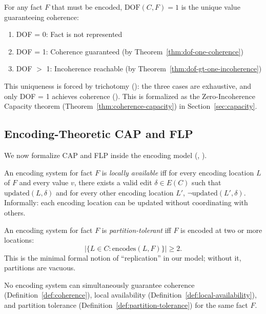 \begin{theorem}[DOF = 1 is Uniquely Coherent]\label{thm:dof-optimal}
For any fact $F$ that must be encoded, $\text{DOF}(C, F) = 1$ is the unique value guaranteeing coherence:
\begin{enumerate}
\tightlist
\item DOF = 0: Fact is not represented
\item DOF = 1: Coherence guaranteed (by Theorem~\ref{thm:dof-one-coherence})
\item DOF $>$ 1: Incoherence reachable (by Theorem~\ref{thm:dof-gt-one-incoherence})
\end{enumerate}
This uniqueness is forced by trichotomy (): the three cases are exhaustive, and only DOF = 1 achieves coherence (). This is formalized as the Zero-Incoherence Capacity theorem (Theorem~\ref{thm:coherence-capacity}) in Section~\ref{sec:capacity}.
\end{theorem}

\subsection{Encoding-Theoretic CAP and FLP}\label{sec:cap-flp}

We now formalize CAP and FLP inside the encoding model (, ).

\begin{definition}\label{def:local-availability}
An encoding system for fact $F$ is \emph{locally available} iff for every encoding location $L$ of $F$ and every value $v$, there exists a valid edit $\delta \in E(C)$ such that $\text{updated}(L, \delta)$ and for every other encoding location $L'$, $\neg \text{updated}(L', \delta)$. Informally: each encoding location can be updated without coordinating with others.
\end{definition}

\begin{definition}\label{def:partition-tolerance}
An encoding system for fact $F$ is \emph{partition-tolerant} iff $F$ is encoded at two or more locations:
\[
|\{L \in C : \text{encodes}(L, F)\}| \ge 2.
\]
This is the minimal formal notion of ``replication'' in our model; without it, partitions are vacuous.
\end{definition}

\begin{theorem}\label{thm:cap-encoding}
No encoding system can simultaneously guarantee coherence (Definition~\ref{def:coherence}), local availability (Definition~\ref{def:local-availability}), and partition tolerance (Definition~\ref{def:partition-tolerance}) for the same fact $F$.
\end{theorem}

